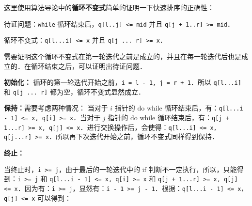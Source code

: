 这里使用算法导论中的\textbf{循环不变式}简单的证明一下快速排序的正确性：

待证问题：\verb|while| 循环结束后，\verb|q[l..j] <= mid| 并且 \verb|q[j + 1..r] >= mid|．

循环不变式：\verb|q[l...i] <= x| 并且 \verb|q[j ... r] >= x|．

需要证明这个循环不变式在第一轮迭代之前是成立的，并且在每一轮迭代后也是成立的．在循环结束之后，可以证明出待证问题．

\textbf{初始化：} 循环的第一轮迭代开始之前，\verb|i = l - 1, j = r + 1|．所以 \verb|q[l...i]| 和 \verb|q[j ... r]| 都为空，循环不变式显然成立．

\textbf{保持：}需要考虑两种情况：
当对于 $i$ 指针的 $\text{do while}$ 循环结束后，有：\verb|q[l...i - 1] <= x, q[i] >= x|．当对于 $j$ 指针的 $\text{do while}$ 循环结束后，有：\verb|q[j + 1...r] >= x, q[j] <= x|．进行交换操作后，会使得：\verb|q[l...i] <= x, q[j...r] >= x|．所以再下次迭代开始之前，循环不变式同样得到保持．

\textbf{终止：}

当终止时，\verb|i >= j|，由于最后的一轮迭代中的 if 判断不一定执行，所以，只能得到：\verb|i >= j| 和 \verb|q[l...i - 1] <= x, q[i] >= x| 和 \verb|q[j + 1...r] >= x, q[j] <= x|．因为有：\verb|i >= j|，显然有：\verb|i - 1 >= j - 1|．根据：\verb|q[l...i - 1] <= x，q[j] <= x| 可以得到：